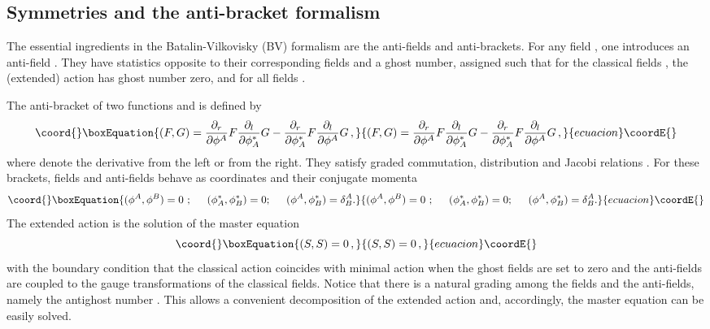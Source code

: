 \documentclass[a4paper,12pt]{article}
\begin{document}

\subsection{Symmetries and the anti-bracket formalism}
\label{BV}

The essential ingredients in the Batalin-Vilkovisky (BV)
\cite{BV,cano,gomis,henne_libro,anti_coho} formalism are the anti-fields and
anti-brackets. For any field \coordHE{}, one introduces an anti-field
\coordHE{}.  They have statistics opposite to their corresponding
fields and a ghost number, assigned such that for the classical fields
\coordHE{}, the (extended) action has ghost number zero, and for
all fields \coordHE{}.

The {anti-bracket} 
of two functions \coordHE{} and \coordHE{} is defined by
\begin{equation}\coord{}\boxEquation{\label{abracket}
\left( F, G \right) = 
\frac{\partial_r }{\partial\phi ^A}  F \frac{\partial_l }{\partial\phi
  ^*_A} G -  
\frac{\partial_r }{\partial\phi ^*_A} F  \frac{\partial_l
  }{\partial\phi ^A} G \, ,   
}{\left( F, G \right) = 
\frac{\partial_r }{\partial\phi ^A}  F \frac{\partial_l }{\partial\phi
  ^*_A} G -  
\frac{\partial_r }{\partial\phi ^*_A} F  \frac{\partial_l
  }{\partial\phi ^A} G \, ,   
}{ecuacion}\coordE{}\end{equation}
where \coordHE{} denote the derivative from the left or from the
right.  They satisfy graded commutation, distribution and Jacobi
relations \cite{BV}.  For these brackets, fields and anti-fields behave
as coordinates and their conjugate momenta
\begin{equation}\coord{}\boxEquation{\label{eq:brackffs}
(\phi^A,\phi^B)=0\ ;\hspace{0.5cm}
(\phi^*_A,\phi^*_B)=0;\hspace{0.5cm}
(\phi^A,\phi^*_B)=\delta^A_B.
}{(\phi^A,\phi^B)=0\ ;\hspace{0.5cm}
(\phi^*_A,\phi^*_B)=0;\hspace{0.5cm}
(\phi^A,\phi^*_B)=\delta^A_B.
}{ecuacion}\coordE{}\end{equation}
%
The extended action \coordHE{} is the solution of the master equation 
\begin{equation}\coord{}\boxEquation{\label{master}
(S,S)=0\,,
}{(S,S)=0\,,
}{ecuacion}\coordE{}\end{equation}
with the boundary condition that the classical action \coordHE{}
coincides with minimal action when the ghost fields are set to zero
and the anti-fields \coordHE{} are coupled to the gauge
transformations of the classical fields.  Notice that there is a
natural grading among the fields and the anti-fields, namely the
antighost number \cite{gomis}. This allows a convenient decomposition
of the extended action and, accordingly, the master equation can be
easily solved.
\end{document}
